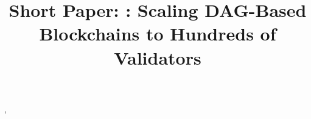 ,\documentclass[runningheads]{llncs}
\newif\ifpublish
\begin{document}
\title{Short Paper: \sysname: Scaling DAG-Based Blockchains to Hundreds of Validators}
\titlerunning{\sysname}

\ifpublish
    \author{
        George Danezis\inst{1,2} \and
        Lefteris Kokoris-Kogias\inst{1} \and
        Alberto Sonnino\inst{1,2} \and
        Srivatsan Sridhar\inst{3} \and
        Mingwei Tian\inst{1} \and
    }
    \authorrunning{G. Danezis et al.}
    \institute{
        Mysten Labs \and
        University College London (UCL) \and
        Stanford University
    }
\else
    \author{}
    \institute{}
\fi

\maketitle

\begin{abstract}
    
    \ifpublish
        \keywords{Blockchain \and BFT Consensus \and Dynamic Participation}
    \fi
\end{abstract}







\ifpublish
    \begin{credits}
        \subsubsection{\ackname}
        
    \end{credits}
\fi



\end{document}
